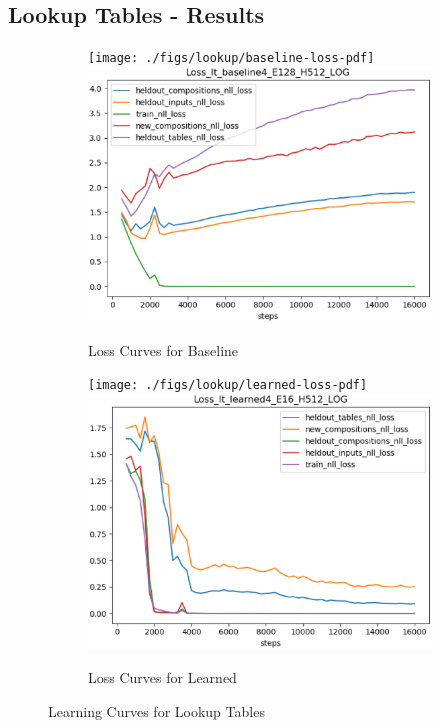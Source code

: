 \subsection{Lookup Tables - Results}
\begin{figure}[ht] 
	\begin{subfigure}[b]{0.5\linewidth}
		\centering
		\ifpdf
		\texttt{[image: ./figs/lookup/baseline-loss-pdf]}
		\else
		\includegraphics[width=0.95\linewidth]{./figs/lookup/baseline-loss-eps}
		\fi
		\caption{Loss Curves for Baseline} 
		\label{lt_baseline} 
		\vspace{2ex}
	\end{subfigure}%
	\begin{subfigure}[b]{0.5\linewidth}
		\centering
		\ifpdf
		\texttt{[image: ./figs/lookup/learned-loss-pdf]}
		\else
		\includegraphics[width=0.95\linewidth]{./figs/lookup/learned-loss-eps}
		\fi 
		\caption{Loss Curves for Learned} 
		\label{lt_learned} 
		\vspace{2ex}
	\end{subfigure}
		\caption{Learning Curves for Lookup Tables}
		\label{lt_learning_curves}
\end{figure}
			
